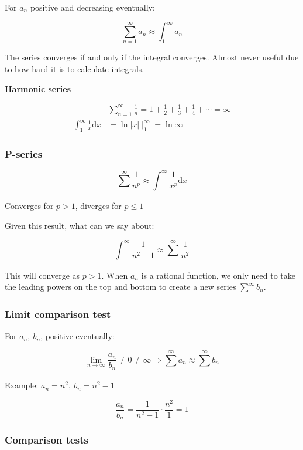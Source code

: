 \documentclass[12pt]{article}
\theoremstyle{plain}
\theoremstyle{remark}
\theoremstyle{definition}
\begin{document}
For \(a_{n}\) positive and decreasing eventually:

\[\sum_{n = 1}^{\infty}a_{n} \approx \int_{1}^{\infty}a_{n}\]

The series converges if and only if the integral converges. Almost never
useful due to how hard it is to calculate integrals.

\textbf{Harmonic series}

\begin{align*}
&\sum_{n = 1}^{\infty}\frac{1}{n} = 1 + \frac{1}{2} + \frac{1}{3} + \frac{1}{4} + \cdots = \infty \\
\int_{1}^{\infty}{\frac{1}{x}\text{d}x} &= \ln|x| \mid_{1}^{\infty} = \ln\infty
\end{align*}



\subsubsection{P-series}

\[\sum_{}^{\infty}\frac{1}{n^{p}} \approx \int_{}^{\infty}{\frac{1}{x^{p}}\text{d}x}\]

Converges for \(p > 1\), diverges for \(p \leq 1\)

Given this result, what can we say about:

\[\int_{}^{\infty}\frac{1}{n^{2} - 1} \approx \sum_{}^{\infty}\frac{1}{n^{2}}\]

This will converge as \(p > 1\). When \(a_{n}\) is a rational function,
we only need to take the leading powers on the top and bottom to create
a new series \(\sum_{}^{\infty}b_{n}\).


\subsubsection{Limit comparison test}

For \(a_{n},\ b_{n}\), positive eventually:

\[\lim_{n \rightarrow \infty}\frac{a_{n}}{b_{n}} \neq 0 \neq \infty \Rightarrow \sum_{}^{\infty}a_{n} \approx \sum_{}^{\infty}b_{n}\]

Example: \(a_{n} = n^{2},\ b_{n} = n^{2} - 1\)

\[\frac{a_{n}}{b_{n}} = \frac{1}{n^{2} - 1} \cdot \frac{n^{2}}{1} = 1\]


\subsubsection{Comparison tests}
\end{document}
